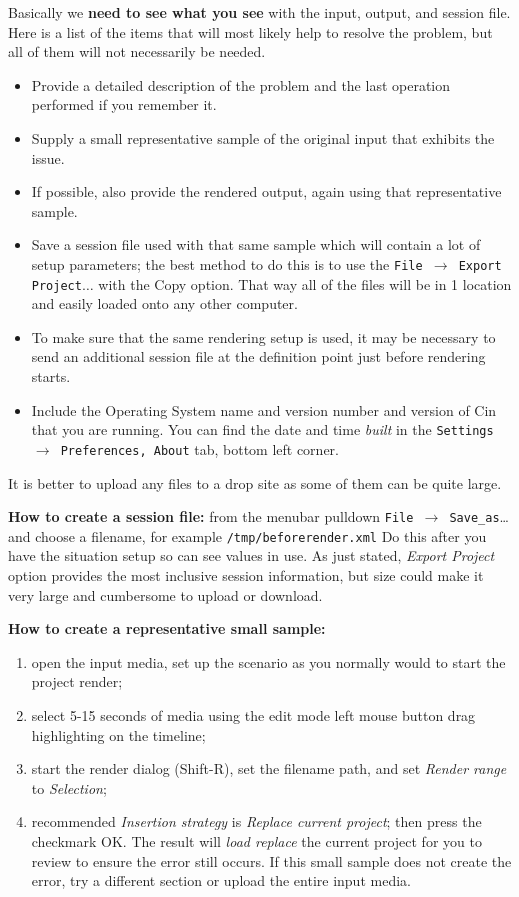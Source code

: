 Basically we\textbf{ need to see what you see }with the input, output, and session file. Here is a list of the items that will most likely help to resolve the problem, but all of them will not necessarily be needed.

\begin{itemize}[nosep]
	\item Provide a detailed description of the problem and the last operation performed if you remember it.
	\item Supply a small representative sample of the original input that exhibits the issue.
	\item If possible, also provide the rendered output, again using that representative sample.
	\item Save a session file used with that same sample which will contain a lot of setup parameters; the best method to do this is to use the \texttt{File $\rightarrow$ Export Project}$\dots$ with the Copy option. That way all of the files will be in 1 location and easily loaded onto any other computer.
	\item To make sure that the same rendering setup is used, it may be necessary to send an additional session file at the definition point just before rendering starts.
	\item Include the Operating System name and version number and version of Cin that you are running. You can find the date and time \textit{built} in the \texttt{Settings $\rightarrow$ Preferences, About} tab, bottom left corner.
\end{itemize} 

It is better to upload any files to a drop site as some of them can be quite large.

\textbf{How to create a session file:} \quad from the menubar pulldown \texttt{File $\rightarrow $ Save\_as}{\dots} \quad and choose a filename, for example \texttt{/tmp/beforerender.xml} Do this after you have the situation setup so can see values in use. As just stated, \textit{Export Project} option provides the most inclusive session information, but size could make it very large and cumbersome to upload or download.

\textbf{How to create a representative small sample:}

\begin{enumerate}[nosep]
	\item open the input media, set up the scenario as you normally would to start the project render;
	\item select 5-15 seconds of media using the edit mode left mouse button drag highlighting on the timeline;
	\item start the render dialog (Shift-R), set the filename path, and set \textit{Render range} to \textit{Selection};
	\item recommended \textit{Insertion strategy} is \textit{Replace current project}; then press the checkmark OK. The result will \textit{load replace} the current project for you to review to ensure the error still occurs. If this small sample does not create the error, try a different section or upload the entire input media.
\end{enumerate}


